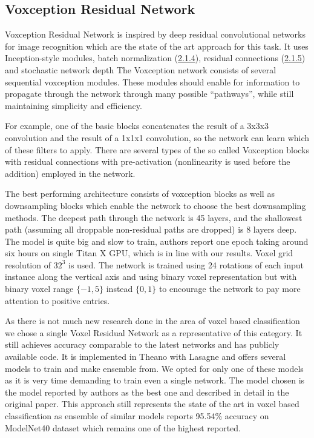 \subsection{Voxception Residual Network}
Voxception Residual Network \cite{brock_generative_2016} is inspired by deep residual convolutional networks for image recognition which are the state of the art approach for this task. It uses Inception-style \cite{szegedy_inception-v4_2016} modules, batch normalization (\hyperref[sec:regularization]{2.1.4}), residual connections (\hyperref[sec:training]{2.1.5}) and stochastic network depth \cite{huang_deep_2016} The Voxception network consists of several sequential voxception modules. These modules  should enable for information to propagate through the network through many possible “pathways”, while still maintaining simplicity and efficiency. \par
For example, one of the basic blocks concatenates the result of a 3x3x3 convolution and the result of a 1x1x1 convolution, so the network can learn which of these filters to apply. There are several types of the so called Voxception blocks with residual connections with pre-activation (nonlinearity is used before the addition) employed in the network. \par
The best performing architecture consists of voxception blocks as well as downsampling blocks which enable the network to choose the best downsampling methods. The deepest path through the network is 45 layers, and the shallowest path (assuming all droppable non-residual paths are dropped) is 8 layers deep.
The model is quite big and slow to train, authors report one epoch taking around six hours on single Titan X GPU, which is in line with our results.
Voxel grid resolution of $32^3$ is used. The network is trained using 24 rotations of each input instance along the vertical axis and using binary voxel representation but with binary voxel range $\{-1,5\}$ instead $\{0,1\}$  to encourage the network to pay more attention to positive entries. \par
As there is not much new research done in the area of voxel based classification we chose a single Voxel Residual Network as a representative of this category. It still achieves accuracy comparable to the latest networks and has publicly available code. It is implemented in Theano with Lasagne and offers several models to train and make ensemble from. We opted for only one of these models as it is very time demanding to train even a single network. The model chosen is the model reported by authors as the best one and described in detail in the original paper. 
This approach still represents the state of the art in voxel based classification as ensemble of similar models reports 95.54\% accuracy on ModelNet40 dataset which remains one of the highest reported.

